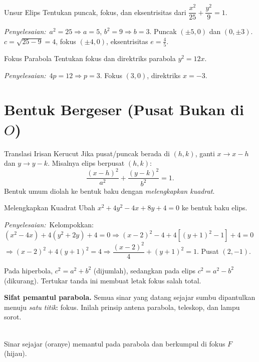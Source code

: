 \documentclass[11pt,a4paper]{report}
\theoremstyle{gaya}
\newcommand{\jawab}{\par\smallskip\noindent\textit{\textcolor{oranye}{Penyelesaian:}}\ }
\begin{document}
\begin{contoh}{Unsur Elips}
Tentukan puncak, fokus, dan eksentrisitas dari $\dfrac{x^2}{25}+\dfrac{y^2}{9}=1$.

\jawab $a^2=25\Rightarrow a=5$, $b^2=9\Rightarrow b=3$. Puncak $(\pm5,0)$ dan $(0,\pm3)$.
$c=\sqrt{25-9}=4$, fokus $(\pm4,0)$, eksentrisitas $e=\tfrac45$.
\end{contoh}

\begin{contoh}{Fokus Parabola}
Tentukan fokus dan direktriks parabola $y^2=12x$.

\jawab $4p=12\Rightarrow p=3$. Fokus $(3,0)$, direktriks $x=-3$.
\end{contoh}

\section{Bentuk Bergeser (Pusat Bukan di $O$)}
\begin{konsep}{Translasi Irisan Kerucut}
Jika pusat/puncak berada di $(h,k)$, ganti $x\to x-h$ dan $y\to y-k$. Misalnya elips berpusat $(h,k)$:
\[
\frac{(x-h)^2}{a^2}+\frac{(y-k)^2}{b^2}=1.
\]
Bentuk umum diolah ke bentuk baku dengan \emph{melengkapkan kuadrat}.
\end{konsep}

\begin{contoh}{Melengkapkan Kuadrat}
Ubah $x^2+4y^2-4x+8y+4=0$ ke bentuk baku elips.

\jawab Kelompokkan: $(x^2-4x)+4(y^2+2y)+4=0\Rightarrow(x-2)^2-4+4[(y+1)^2-1]+4=0$
$\Rightarrow(x-2)^2+4(y+1)^2=4\Rightarrow\dfrac{(x-2)^2}{4}+(y+1)^2=1.$ Pusat $(2,-1)$.
\end{contoh}

\begin{kesalahan}
Pada hiperbola, $c^2=a^2+b^2$ (dijumlah), sedangkan pada elips $c^2=a^2-b^2$ (dikurang). Tertukar tanda ini membuat letak fokus salah total.
\end{kesalahan}

\smallskip\noindent\textbf{Sifat pemantul parabola.} Semua sinar yang datang sejajar sumbu dipantulkan menuju \emph{satu titik}: fokus. Inilah prinsip antena parabola, teleskop, dan lampu sorot.
\begin{center}
\\
\small Sinar sejajar (oranye) memantul pada parabola dan berkumpul di fokus $F$ (hijau).
\end{center}
\end{document}
